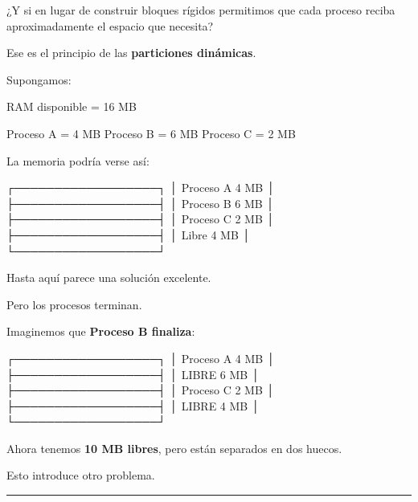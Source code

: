 \documentclass[
  spanish,
  letterpaper,
]{scrbook}
\newenvironment{Shaded}{\begin{snugshade}}{\end{snugshade}}
\newcommand{\NormalTok}[1]{\textcolor[rgb]{0.00,0.23,0.31}{#1}}
\begin{document}
¿Y si en lugar de construir bloques rígidos permitimos que cada proceso
reciba aproximadamente el espacio que necesita?

Ese es el principio de las \textbf{particiones dinámicas}.

Supongamos:

\begin{Shaded}
\begin{Highlighting}[]
\NormalTok{RAM disponible = 16 MB}

\NormalTok{Proceso A = 4 MB}
\NormalTok{Proceso B = 6 MB}
\NormalTok{Proceso C = 2 MB}
\end{Highlighting}
\end{Shaded}

La memoria podría verse así:

\begin{Shaded}
\begin{Highlighting}[]
\NormalTok{┌──────────────────┐}
\NormalTok{│ Proceso A   4 MB │}
\NormalTok{├──────────────────┤}
\NormalTok{│ Proceso B   6 MB │}
\NormalTok{├──────────────────┤}
\NormalTok{│ Proceso C   2 MB │}
\NormalTok{├──────────────────┤}
\NormalTok{│ Libre       4 MB │}
\NormalTok{└──────────────────┘}
\end{Highlighting}
\end{Shaded}

Hasta aquí parece una solución excelente.

Pero los procesos terminan.

Imaginemos que \textbf{Proceso B finaliza}:

\begin{Shaded}
\begin{Highlighting}[]
\NormalTok{┌──────────────────┐}
\NormalTok{│ Proceso A   4 MB │}
\NormalTok{├──────────────────┤}
\NormalTok{│ LIBRE       6 MB │}
\NormalTok{├──────────────────┤}
\NormalTok{│ Proceso C   2 MB │}
\NormalTok{├──────────────────┤}
\NormalTok{│ LIBRE       4 MB │}
\NormalTok{└──────────────────┘}
\end{Highlighting}
\end{Shaded}

Ahora tenemos \textbf{10 MB libres}, pero están separados en dos huecos.

Esto introduce otro problema.

\begin{center}\rule{0.5\linewidth}{0.5pt}\end{center}

\end{document}
